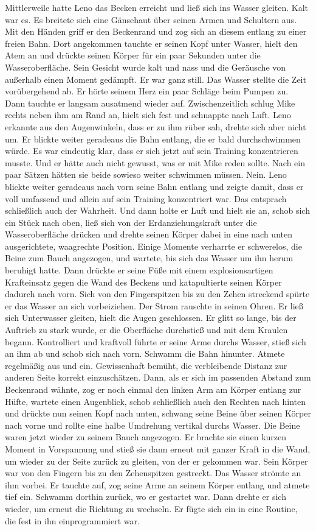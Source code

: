 \documentclass[ngerman,smalldemyvopaper,11pt,oneside,onecolumn,openright,extrafontsizes]{memoir}
\begin{document}
Mittlerweile hatte Leno das Becken erreicht und ließ sich ins Wasser gleiten. Kalt war es. Es breitete sich eine Gänsehaut über seinen Armen und Schultern aus. Mit den Händen griff er den Beckenrand und zog sich an diesem entlang zu einer freien Bahn. Dort angekommen tauchte er seinen Kopf unter Wasser, hielt den Atem an und drückte seinen Körper für ein paar Sekunden unter die Wasseroberfläche. Sein Gesicht wurde kalt und nass und die Geräusche von außerhalb einen Moment gedämpft. Er war ganz still. Das Wasser stellte die Zeit vorübergehend ab. Er hörte seinem Herz ein paar Schläge beim Pumpen zu. Dann tauchte er langsam ausatmend wieder auf. Zwischenzeitlich schlug Mike rechts neben ihm am Rand an, hielt sich fest und schnappte nach Luft. Leno erkannte aus den Augenwinkeln, dass er zu ihm rüber sah, drehte sich aber nicht um. Er blickte weiter geradeaus die Bahn entlang, die er bald durchschwimmen würde. Es war eindeutig klar, dass er sich jetzt auf sein Training konzentrieren musste. Und er hätte auch nicht gewusst, was er mit Mike reden sollte. Nach ein paar Sätzen hätten sie beide sowieso weiter schwimmen müssen. Nein. Leno blickte weiter geradeaus nach vorn seine Bahn entlang und zeigte damit, dass er voll umfassend und allein auf sein Training konzentriert war. Das entsprach schließlich auch der Wahrheit. Und dann holte er Luft und hielt sie an, schob sich ein Stück nach oben, ließ sich von der Erdanziehungskraft unter die Wasseroberfläche drücken und drehte seinen Körper dabei in eine nach unten ausgerichtete, waagrechte Position. Einige Momente verharrte er schwerelos, die Beine zum Bauch angezogen, und wartete, bis sich das Wasser um ihn herum beruhigt hatte. Dann drückte er seine Füße mit einem explosionsartigen Krafteinsatz gegen die Wand des Beckens und katapultierte seinen Körper dadurch nach vorn. Sich von den Fingerspitzen bis zu den Zehen streckend spürte er das Wasser an sich vorbeiziehen. Der Strom rauschte in seinen Ohren. Er ließ sich Unterwasser gleiten, hielt die Augen geschlossen. Er glitt so lange, bis der Auftrieb zu stark wurde, er die Oberfläche durchstieß und mit dem Kraulen begann. Kontrolliert und kraftvoll führte er seine Arme durchs Wasser, stieß sich an ihm ab und schob sich nach vorn. Schwamm die Bahn hinunter. Atmete regelmäßig aus und ein. Gewissenhaft bemüht, die verbleibende Distanz zur anderen Seite korrekt einzuschätzen. Dann, als er sich im passenden Abstand zum Beckenrand wähnte, zog er noch einmal den linken Arm am Körper entlang zur Hüfte, wartete einen Augenblick, schob schließlich auch den Rechten nach hinten und drückte nun seinen Kopf nach unten, schwang seine Beine über seinen Körper nach vorne und rollte eine halbe Umdrehung vertikal durchs Wasser. Die Beine waren jetzt wieder zu seinem Bauch angezogen. Er brachte sie einen kurzen Moment in Vorspannung und stieß sie dann erneut mit ganzer Kraft in die Wand, um wieder zu der Seite zurück zu gleiten, von der er gekommen war. Sein Körper war von den Fingern bis zu den Zehenspitzen gestreckt. Das Wasser strömte an ihm vorbei. Er tauchte auf, zog seine Arme an seinem Körper entlang und atmete tief ein. Schwamm dorthin zurück, wo er gestartet war. Dann drehte er sich wieder, um erneut die Richtung zu wechseln. Er fügte sich ein in eine Routine, die fest in ihn einprogrammiert war. 
\end{document}
